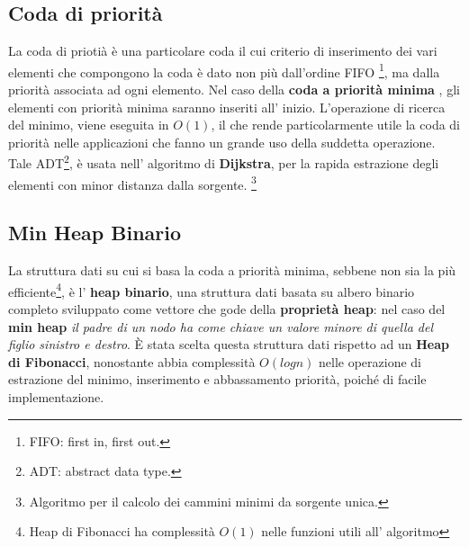 \subsection{Coda di priorit\`a}
La coda di prioti\`a \`e una particolare coda il cui criterio di inserimento
dei vari elementi che compongono la coda \`e dato non pi\`u dall'ordine FIFO
\footnote{FIFO: first in, first out.},
ma dalla priorit\`a associata ad ogni elemento. Nel caso della \textbf{coda a
priorit\`a minima }, gli elementi con priorit\`a minima saranno inseriti all' 
inizio. L'operazione di ricerca del minimo, viene eseguita in $O(1)$, il che
rende particolarmente utile la coda di priorit\`a nelle applicazioni che fanno
un grande uso della suddetta operazione. Tale ADT\footnote{ADT: abstract data
type.}, \`e usata nell' algoritmo di \textbf{Dijkstra}, per la rapida
estrazione degli elementi con minor distanza dalla sorgente.
\footnote{Algoritmo per il calcolo dei cammini minimi da sorgente unica.}

\subsection{Min Heap Binario}
La struttura dati su cui si basa la coda a priorit\`a minima,
sebbene non sia la pi\`u efficiente\footnote{ Heap di Fibonacci 
ha complessit\`a $O(1)$ nelle funzioni utili all' algoritmo}, \`e  l'
\textbf{heap binario}, una struttura dati basata su albero binario completo
sviluppato come vettore che gode della \textbf{propriet\`a
heap}: nel caso del \textbf{min heap} \textit{il padre di un nodo ha come chiave 
un valore minore di quella del figlio sinistro e destro}. \`E stata scelta
questa struttura dati rispetto ad un \textbf{Heap di Fibonacci}, nonostante 
abbia complessit\`a $O(logn)$ nelle operazione di estrazione del minimo,
inserimento e abbassamento priorit\`a, poich\'e di facile implementazione.
